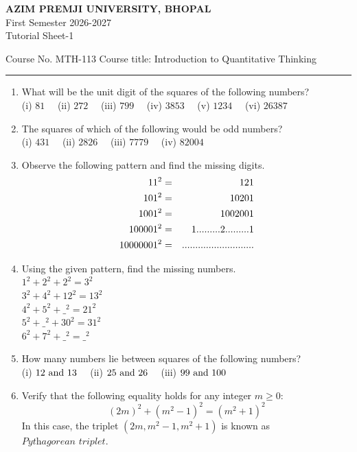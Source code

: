 \documentclass[a4paper,leqno,12pt]{amsart}
\begin{document}
\begin{center}
{{\textbf{ AZIM PREMJI UNIVERSITY, BHOPAL}\\
First Semester  2026-2027\\
Tutorial Sheet-1 }}
\end{center}

\noindent Course No. MTH-113 \hfill  Course title: Introduction to Quantitative Thinking
\vspace{.3cm}
\hrule 
\vspace{.3cm}


\begin{enumerate}
\setlength\itemsep{1em}
\item What will be the unit digit of the squares of the following numbers?\\
(i) $81 \quad$ (ii) $272 \quad$ (iii) $799 \quad $ (iv) $3853 \quad $ (v) $1234 \quad $ (vi) $26387$

\item The squares of which of the following would be odd numbers? \\
(i) $431 \quad$ (ii) $2826 \quad$ (iii) $7779 \quad $ (iv) $82004$

\item Observe the following pattern and find the missing digits.
\begin{eqnarray*}
 11^2 &=& 121 \cr
 101^2 &=& 10201 \cr 
 1001^2 &=& 1002001 \cr
 100001^2 &=& 1 ......... 2 ......... 1 \cr
 10000001^2 &=& ...........................
\end{eqnarray*}

\item Using the given pattern, find the missing numbers.\\
$1^2 + 2^2 + 2^2 = 3^2$\\
$3^2 + 4^2 + 12^2 = 13^2$\\
$4^2 + 5^2 + \_^2 = 21^2$\\
$5^2 + \_^2 + 30^2 = 31^2$\\
$6^2 + 7^2 + \_^2 = \_^2$

\item How many numbers lie between squares of the following numbers?\\
(i) $12 \ {\rm and} \ 13 \quad$ (ii) $25 \ {\rm and} \ 26 \quad$ (iii) $99 \ {\rm and} \ 100$


\item Verify that the following equality holds for any integer $m \geq 0$:
\[
(2m)^2 + (m^2 - 1)^2 = (m^2 + 1)^2
\]
In this case, the triplet $(2m, m^2 -1, m^2 +1)$ is known as $\textit{Pythagorean triplet}$.


\end{enumerate}
\end{document}
